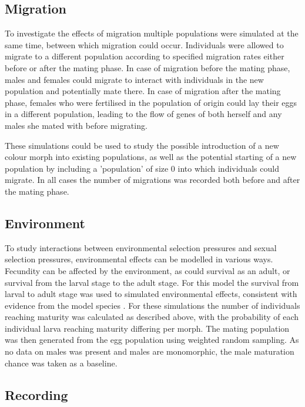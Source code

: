 \documentclass{article}
\begin{document}
\subsection{Migration}

To investigate the effects of migration multiple populations were simulated at the same time, between which migration could occur. Individuals were allowed to migrate to a different population according to specified migration rates either before or after the mating phase. In case of migration before the mating phase, males and females could migrate to interact with individuals in the new population and potentially mate there. In case of migration after the mating phase, females who were fertilised in the population of origin could lay their eggs in a different population, leading to the flow of genes of both herself and any males she mated with before migrating.

These simulations could be used to study the possible introduction of a new colour morph into existing populations, as well as the potential starting of a new population by including a 'population' of size 0 into which individuals could migrate. In all cases the number of migrations was recorded both before and after the mating phase.

\subsection{Environment}

To study interactions between environmental selection pressures and sexual selection pressures, environmental effects can be modelled in various ways. Fecundity can be affected by the environment, as could survival as an adult, or survival from the larval stage to the adult stage. For this model the survival from larval to adult stage was used to simulated environmental effects, consistent with evidence from the model species \cite{Svensson2019}. For these simulations the number of individuals reaching maturity was calculated as described above, with the probability of each individual larva reaching maturity differing per morph. The mating population was then generated from the egg population using weighted random sampling. As no data on males was present and males are monomorphic, the male maturation chance was taken as a baseline.

\subsection{Recording}
\end{document}
